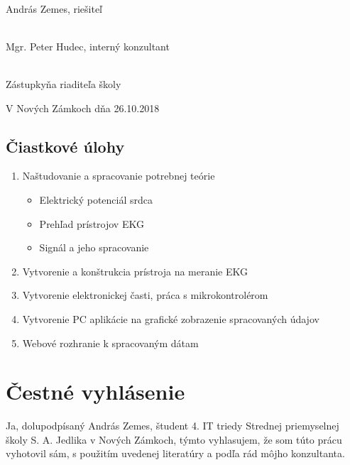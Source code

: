 \documentclass[titlepage,12pt]{article}
\begin{document}
\vspace{20mm}
\hrulefill
\\\hspace*{0mm}\phantom{v.r.: }András Zemes, riešiteľ

\vspace{10mm}
\hrulefill
\\\hspace*{0mm}\phantom{v.r.: }Mgr. Peter Hudec, interný konzultant

\vspace{10mm}
\hrulefill
\\\hspace*{0mm}\phantom{v.r.: }Zástupkyňa riaditeľa školy

\vspace{10mm}
V Nových Zámkoch dňa 26.10.2018

\newpage

\subsection*{Čiastkové úlohy}
\begin{enumerate}
	\item Naštudovanie a spracovanie potrebnej teórie
	\begin{itemize}
		\item Elektrický potenciál srdca
       	\item Prehľad prístrojov EKG
       	\item Signál a jeho spracovanie
	\end{itemize}
    \item Vytvorenie a konštrukcia prístroja na meranie EKG
    \item Vytvorenie elektronickej časti, práca s mikrokontrolérom
    \item Vytvorenie PC aplikácie na grafické zobrazenie spracovaných údajov
    \item Webové rozhranie k spracovaným dátam
\end{enumerate}

\newpage
\vspace*{\fill}
\section*{Čestné vyhlásenie}

Ja, dolupodpísaný András Zemes, študent 4. IT triedy Strednej priemyselnej školy S. A. Jedlika v Nových Zámkoch, týmto vyhlasujem, že som túto prácu   vyhotovil sám, s použitím uvedenej literatúry a podľa rád môjho konzultanta. 
\end{document}
